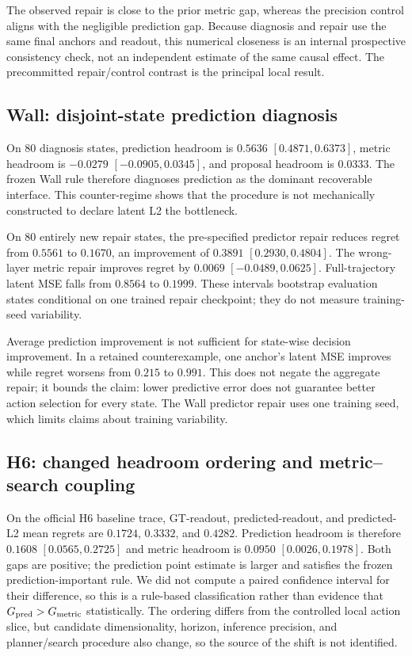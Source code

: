 The observed repair is close to the prior metric gap, whereas the precision control aligns with the negligible prediction gap. Because diagnosis and repair use the same final anchors and readout, this numerical closeness is an internal prospective consistency check, not an independent estimate of the same causal effect. The precommitted repair/control contrast is the principal local result.

\subsection{Wall: disjoint-state prediction diagnosis}

On 80 diagnosis states, prediction headroom is $0.5636$ $[0.4871,0.6373]$, metric headroom is $-0.0279$ $[-0.0905,0.0345]$, and proposal headroom is $0.0333$. The frozen Wall rule therefore diagnoses prediction as the dominant recoverable interface. This counter-regime shows that the procedure is not mechanically constructed to declare latent L2 the bottleneck.

On 80 entirely new repair states, the pre-specified predictor repair reduces regret from $0.5561$ to $0.1670$, an improvement of $0.3891$ $[0.2930,0.4804]$. The wrong-layer metric repair improves regret by $0.0069$ $[-0.0489,0.0625]$. Full-trajectory latent MSE falls from $0.8564$ to $0.1999$. These intervals bootstrap evaluation states conditional on one trained repair checkpoint; they do not measure training-seed variability.

Average prediction improvement is not sufficient for state-wise decision improvement. In a retained counterexample, one anchor's latent MSE improves while regret worsens from $0.215$ to $0.991$. This does not negate the aggregate repair; it bounds the claim: lower predictive error does not guarantee better action selection for every state. The Wall predictor repair uses one training seed, which limits claims about training variability.

\subsection{H6: changed headroom ordering and metric--search coupling}

On the official H6 baseline trace, GT-readout, predicted-readout, and predicted-L2 mean regrets are $0.1724$, $0.3332$, and $0.4282$. Prediction headroom is therefore $0.1608$ $[0.0565,0.2725]$ and metric headroom is $0.0950$ $[0.0026,0.1978]$. Both gaps are positive; the prediction point estimate is larger and satisfies the frozen prediction-important rule. We did not compute a paired confidence interval for their difference, so this is a rule-based classification rather than evidence that $G_{\mathrm{pred}}>G_{\mathrm{metric}}$ statistically. The ordering differs from the controlled local action slice, but candidate dimensionality, horizon, inference precision, and planner/search procedure also change, so the source of the shift is not identified.

